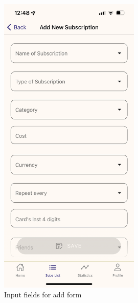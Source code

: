 \documentclass[11pt]{article}
\begin{document}
\begin{figure}[h!]
\begin{minipage}[c]{0.45\textwidth}
        \includegraphics[width=0.6\textwidth, clip]{../../assets/smartphone/add.PNG}
        \caption{Input fields for add form}
        \label{fig:add}
    \end{minipage}
\end{figure}
\end{document}
